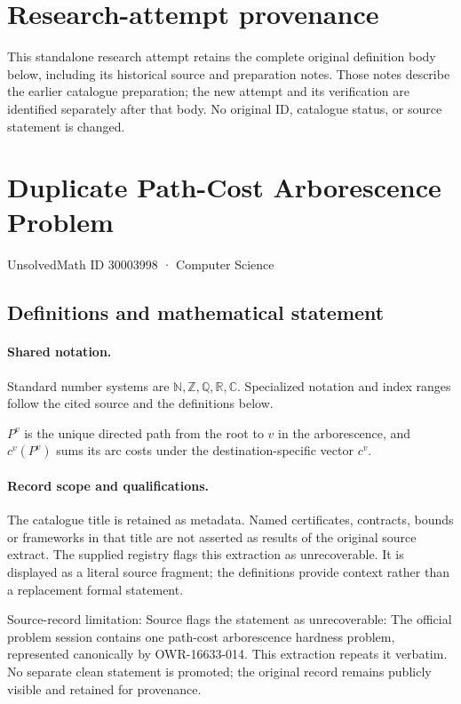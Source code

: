 \documentclass[11pt]{article}
\begin{document}
\section*{Research-attempt provenance}
This standalone research attempt retains the complete original definition body below,
including its historical source and preparation notes. Those notes describe the
earlier catalogue preparation; the new attempt and its verification are identified
separately after that body. No original ID, catalogue status, or source statement is changed.

\section{Duplicate Path-Cost Arborescence Problem}\label{30003998}
{\small UnsolvedMath ID 30003998 · Computer Science}
\subsection{Definitions and mathematical statement}

\paragraph{Shared notation.}Standard number systems are $\mathbb N,\mathbb Z,\mathbb Q,\mathbb R,\mathbb C$. Specialized notation and index ranges follow the cited source and the definitions below.


$P^v$ is the unique directed path from the root to $v$ in the arborescence, and $c^v(P^v)$ sums its arc costs under the destination-specific vector $c^v$.
\paragraph{Record scope and qualifications.}
The catalogue title is retained as metadata. Named certificates, contracts, bounds or frameworks in that title are not asserted as results of the original source extract.
The supplied registry flags this extraction as unrecoverable. It is displayed as a literal source fragment; the definitions provide context rather than a replacement formal statement.

Source-record limitation: Source flags the statement as unrecoverable: The official problem session contains one path-cost arborescence hardness problem, represented canonically by OWR-16633-014. This extraction repeats it verbatim. No separate clean statement is promoted; the original record remains publicly visible and retained for provenance.
\end{document}
